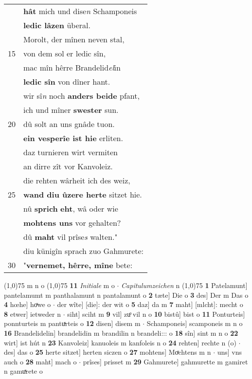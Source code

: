 \documentclass[8pt,a4paper,notitlepage]{article}
\begin{document}
\begin{table}[ht]
\begin{minipage}[t]{0.5\linewidth}
\begin{tabular}{rl}
 & \textbf{hât} mich und dise\textit{n} Schamponeis\\ 
 & \textbf{ledic lâzen} überal.\\ 
 & Morolt, der mînen neven stal,\\ 
15 & von dem sol er ledic sîn,\\ 
 & mac mîn hêrre Brandelid\textit{el}in\\ 
 & \textbf{ledic sîn} von dîner hant.\\ 
 & wir sî\textit{n} noch \textbf{anders beide} pfant,\\ 
 & ich und mîner \textbf{swester} sun.\\ 
20 & dû solt an uns gnâde tuon.\\ 
 & \textbf{ein vesperîe ist hie} erliten.\\ 
 & daz turnieren wirt vermiten\\ 
 & an dirre zît vor Kanvoleiz.\\ 
 & die rehten wârheit ich des weiz,\\ 
25 & \textbf{wand diu ûzere herte} sitzet hie.\\ 
 & nû \textbf{sprich} \textbf{eht}, wâ oder wie\\ 
 & \textbf{mohtens uns} vor gehalten?\\ 
 & dû \textbf{maht} vil prîse\textit{s} walten."\\ 
 & diu künigîn sprach zuo Gahmurete:\\ 
30 & "\textbf{vernemet, hêrre, mîne} bete:\\ 
\end{tabular}
\scriptsize
\line(1,0){75} \newline
m n o \newline
\line(1,0){75} \newline
\textbf{11} \textit{Initiale} m o   $\cdot$ \textit{Capitulumzeichen} n  \newline
\line(1,0){75} \newline
\textbf{1} Patelamunt] pantelamumt m panthalamunt n pantalamunt o \textbf{2} tæte] Die o \textbf{3} des] Der m Das o \textbf{4} hœhe] hoͯwe o  $\cdot$ der wîte] [die]: der wit o \textbf{5} daz] da m \textbf{7} maht] [mlcht]: mecht o \textbf{8} etwer] ietweder n  $\cdot$ siht] sciht m \textbf{9} vil] zuͦ vil n o \textbf{10} bistû] bist o \textbf{11} Ponturteis] ponnturteis m pantuͯrteis o \textbf{12} disen] disem m  $\cdot$ Schamponeis] scamponeis m n o \textbf{16} Brandelidelin] brandelidin m brandilin n brandeli::: o \textbf{18} sîn] sint m n o \textbf{22} wirt] ist hút n \textbf{23} Kanvoleiz] kanuoleis m kanfoleis n o \textbf{24} rehten] rechte n (o)  $\cdot$ des] das o \textbf{25} herte sitzet] herten siczen o \textbf{27} mohtens] Moͯchtens m n  $\cdot$ uns] vns auch o \textbf{28} maht] mach o  $\cdot$ prîses] prisset m \textbf{29} Gahmurete] gahmurette m gamiret n gamuͯrete o \newline
\end{minipage}
\end{table}
\end{document}
